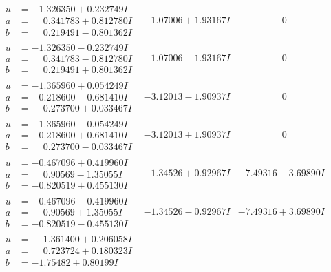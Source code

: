 \documentclass[1p]{elsarticle_modified}
\theoremstyle{definition}
\begin{document}
$$\begin{array}{c|c|c}
\begin{aligned}
u &= -1.326350 + 0.232749 I \\
a &= \phantom{-}0.341783 + 0.812780 I \\
b &= \phantom{-}0.219491 - 0.801362 I\end{aligned}
 & -1.07006 + 1.93167 I & \phantom{-0.000000 } 0 \\ \hline\begin{aligned}
u &= -1.326350 - 0.232749 I \\
a &= \phantom{-}0.341783 - 0.812780 I \\
b &= \phantom{-}0.219491 + 0.801362 I\end{aligned}
 & -1.07006 - 1.93167 I & \phantom{-0.000000 } 0 \\ \hline\begin{aligned}
u &= -1.365960 + 0.054249 I \\
a &= -0.218600 - 0.681410 I \\
b &= \phantom{-}0.273700 + 0.033467 I\end{aligned}
 & -3.12013 - 1.90937 I & \phantom{-0.000000 } 0 \\ \hline\begin{aligned}
u &= -1.365960 - 0.054249 I \\
a &= -0.218600 + 0.681410 I \\
b &= \phantom{-}0.273700 - 0.033467 I\end{aligned}
 & -3.12013 + 1.90937 I & \phantom{-0.000000 } 0 \\ \hline\begin{aligned}
u &= -0.467096 + 0.419960 I \\
a &= \phantom{-}0.90569 - 1.35055 I \\
b &= -0.820519 + 0.455130 I\end{aligned}
 & -1.34526 + 0.92967 I & -7.49316 - 3.69890 I \\ \hline\begin{aligned}
u &= -0.467096 - 0.419960 I \\
a &= \phantom{-}0.90569 + 1.35055 I \\
b &= -0.820519 - 0.455130 I\end{aligned}
 & -1.34526 - 0.92967 I & -7.49316 + 3.69890 I \\ \hline\begin{aligned}
u &= \phantom{-}1.361400 + 0.206058 I \\
a &= \phantom{-}0.723724 + 0.180323 I \\
b &= -1.75482 + 0.80199 I\end{aligned}

\end{array}$$
\end{document}

